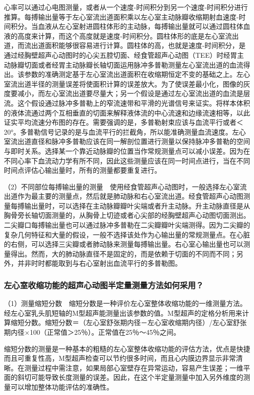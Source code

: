 心率可以通过心电图测量，或者从一个速度-时间积分到另一个速度-时间积分进行推算。每搏输出量等于左心室流出道面积乘以左心室主动脉瓣收缩期射血速度-时间积分。当血液从左心室射进圆柱体形的主动脉，每搏输出量就可以通过圆柱体血液的高度来计算，而这个高度就是速度-时间积分。圆柱体形的底是左心室流出道，而流出道面积能够很容易进行计算。圆柱体的高，也就是速度-时间积分，是通过经胸壁超声心动图时的心尖五腔切面、经食管超声心动图（TEE）时经胃主动脉瓣切面或者经胃主动脉瓣长轴切面运用脉冲多普勒测量左心室流出道的血流得出。该参数的准确测定基于左心室流出道面积在收缩期恒定不变的基础之上。左心室流出道半径的测量误差将使面积计算的误差放大。为了使误差最小化，图像的灰度要减小，而左心室流出道要尽量大；另一个假设是通过左心室流出道的血流是层流。这个假设通过脉冲多普勒上的窄流速带和平滑的光谱信号来证实。将样本体积的液体流通过两个互相垂直的切面来解释液体流的中心流速和边缘流速相等，以此证实平均流速分布图的存在。需要强调的是，多普勒射束应该与血流平行或者＜20°。多普勒信号记录的是与血流平行的拦截角，所以能准确测量血流速度。左心室流出道直径和脉冲多普勒应该在同一解剖位置进行测量以保持脉冲多普勒的空间与即时关系。选择某一个靠近动脉瓣的位置当作常规测量点可以减小误差。因为在不同心率下血流动力学有所不同，因此这些测量应该在同一时间点进行，当在不同时间点评估心输出量时，所有的测量都要重复进行。

（2）不同部位每搏输出量的测量　使用经食管超声心动图时，一般选择左心室流出道作为最主要的测量点，然后就是肺动脉和右心室流出道。经食管超声心动图测量每搏输出量时，可以选择在主动脉瓣瓣叶尖端或者升主动脉。升主动脉直径是从胸骨旁长轴切面测量的，从胸骨上切迹或者心尖部的经胸壁超声心动图切面测出。二尖瓣口每搏输出量也可以通过脉冲多普勒在二尖瓣瓣叶尖端测得。因为二尖瓣的复杂几何特征和大量的假设，一般不选择该处作为心输出量的常规测量点。在心脏的右侧，可以选择三尖瓣或者肺动脉来测量每搏输出量。右心室心输出量也可以测量得出。然而，大的肺动脉直径不是固定的，而是依赖于切面的不同而不同；另外，并非时时都能取到与右心室射出血流平行的多普勒图。

\subsubsection{左心室收缩功能的超声心动图半定量测量方法如何采用？}

（1）测量缩短分数　缩短分数是一种评价左心室整体收缩功能的一维测量方法。经左心室乳头肌短轴的M型超声能测量出该参数的值。M型超声的定格分析用来计算缩短分数。缩短分数＝（左心室舒张期内径－左心室收缩期内径）/左心室舒张期内径×100（正常值＞25％）。正常值在25％～45％之间。

缩短分数的测量是一种基本的粗糙的左心室整体收缩功能的评估方法，优点是快捷而且可重复性高，M型超声检查可以节约很多时间，而且心内膜边界显示非常清晰。在测量过程中需注意，如果局部心室壁存在异常运动，容易产生误差；一维平面的斜切可能导致长度测量的误差。因此，在这个半定量测量中加入另外维度的测量可以增加整体功能评估的准确性。

